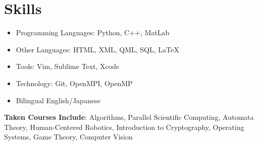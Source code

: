 \documentclass{Custom_CV}
\begin{document}
\section{Skills}

\begin{itemize}[noitemsep]
\item Programming Languages: Python, C++, MatLab
\item Other Languages: HTML, XML, QML, SQL, \LaTeX
\item Tools: Vim, Sublime Text, Xcode
\item Technology: Git, OpenMPI, OpenMP
\item Bilingual English/Japanese
\end{itemize}

\textbf{Taken Courses Include}:
Algorithms, Parallel Scientific Computing, Automata Theory, Human-Centered Robotics, Introduction to Cryptography, Operating Systems, Game Theory, Computer Vision




\end{document}

